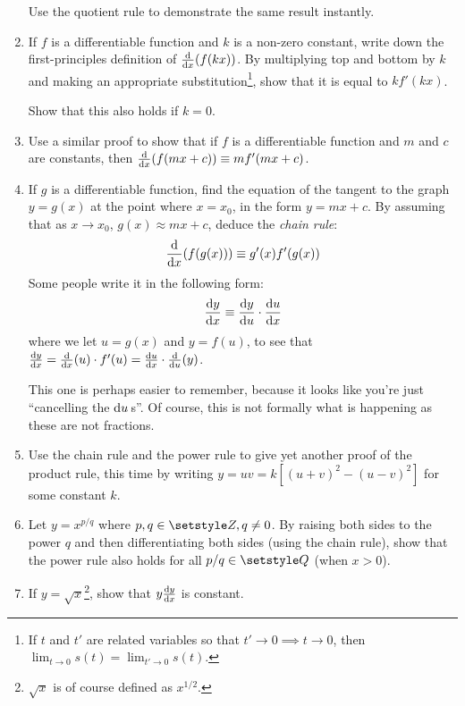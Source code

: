 \begin{enumerate}
  Use the quotient rule to demonstrate the same result instantly.
 \item
  If \(f\) is a differentiable function and \(k\) is a non-zero constant,
  write down the first-principles definition of \(\dv{x}(f(kx))\). By
  multiplying top and bottom by \(k\) and making an appropriate
  substitution\footnote{
   If \(t\) and \(t'\) are related variables so that
   \(t' \to 0 \implies t \to 0\), then
   \(\lim_{t \to 0} s(t) = \lim_{t' \to 0} s(t)\).
  }, show that it is equal to \(kf'(kx)\).

  Show that this also holds if \(k = 0\).
 \item
  Use a similar proof to show that if \(f\) is a differentiable function and
  \(m\) and \(c\) are constants, then \(\dv{x}(f(mx + c)) \equiv mf'(mx + c)\).
 \item
  If \(g\) is a differentiable function, find the equation of the tangent to the
  graph \(y = g(x)\) at the point where \(x = x_0\), in the form
  \(y = mx + c\). By assuming that as \(x \to x_0\), \(g(x) \approx mx + c\),
  deduce the \emph{chain rule}:
  \begin{equation*}
   \dv{x}(f(g(x))) \equiv g'(x) f'(g(x))
  \end{equation*}
  Some people write it in the following form:
  \begin{equation*}
   \dv<y>{x} \equiv \dv<y>{u} \cdot \dv<u>{x}
  \end{equation*}
  where we let \(u = g(x)\) and \(y = f(u)\), to see that
  \(\dv<y>{x}
    = \dv{x}(u) \cdot f'(u)
    = \dv<u>{x} \cdot \dv{u}(y)\).

  This one is perhaps easier to remember, because it looks like you're just
  ``cancelling the \(\mathrm d u\,\)s''. Of course, this is not formally what is
  happening as these are not fractions.
 \item
  Use the chain rule and the power rule to give yet another proof of the product
  rule, this time by writing \(y = uv = k[(u + v)^2 - (u - v)^2]\) for some
  constant \(k\).
 \item
  Let \(y = x^{p/q}\) where \(p, q \in \Integers, q \ne 0\). By raising both
  sides to the power \(q\) and then differentiating both sides (using the chain
  rule), show that the power rule also holds for all \(p / q \in \Rationals\)
  (when \(x > 0\)).
 \item
  If \(y = \sqrt x\)\footnote{
   \(\sqrt x\) is of course defined as \(x^{1/2}\).
  }, show that \(y \dv<y>{x}\) is constant.


\end{enumerate}
